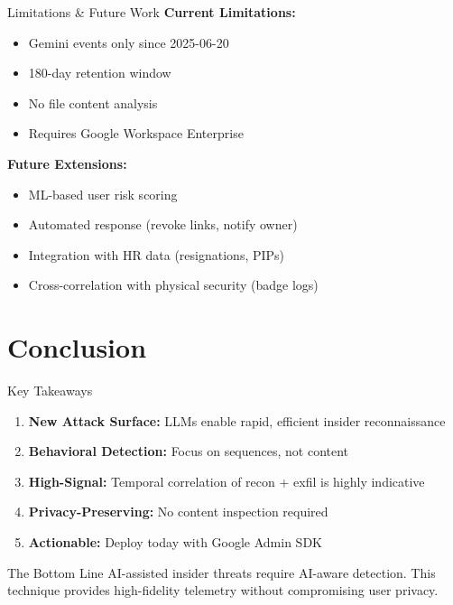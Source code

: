 \documentclass[aspectratio=169]{beamer}
\begin{document}
\begin{frame}{Limitations \& Future Work}
\textbf{Current Limitations:}
\begin{itemize}
    \item Gemini events only since 2025-06-20
    \item 180-day retention window
    \item No file content analysis
    \item Requires Google Workspace Enterprise
\end{itemize}

\vspace{1em}

\textbf{Future Extensions:}
\begin{itemize}
    \item ML-based user risk scoring
    \item Automated response (revoke links, notify owner)
    \item Integration with HR data (resignations, PIPs)
    \item Cross-correlation with physical security (badge logs)
\end{itemize}
\end{frame}

\section{Conclusion}

\begin{frame}{Key Takeaways}
\begin{enumerate}
    \item \textbf{New Attack Surface:} LLMs enable rapid, efficient insider reconnaissance
    \item \textbf{Behavioral Detection:} Focus on sequences, not content
    \item \textbf{High-Signal:} Temporal correlation of recon + exfil is highly indicative
    \item \textbf{Privacy-Preserving:} No content inspection required
    \item \textbf{Actionable:} Deploy today with Google Admin SDK
\end{enumerate}

\vspace{1em}

\begin{block}{The Bottom Line}
AI-assisted insider threats require AI-aware detection. This technique provides high-fidelity telemetry without compromising user privacy.
\end{block}
\end{frame}
\end{document}
